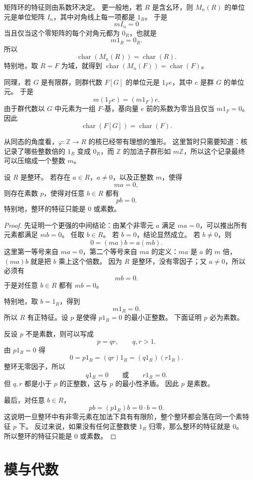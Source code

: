 矩阵环的特征则由系数环决定。
更一般地，若 $R$ 是含幺环，则 $M_n(R)$ 的单位元是单位矩阵 $I_n$，其中对角线上每一项都是 $1_R$。
于是
\[
mI_n=0
\]
当且仅当这个零矩阵的每个对角元都为 $0_R$，也就是
\[
m1_R=0_R.
\]
所以
\[
\operatorname{char}(M_n(R))=\operatorname{char}(R).
\]
特别地，取 $R=F$ 为域，就得到 $\operatorname{char}(M_n(F))=\operatorname{char}(F)$。

同理，若 $G$ 是有限群，则群代数 $F[G]$ 的单位元是 $1_F e$，其中 $e$ 是群 $G$ 的单位元。
于是
\[
m(1_F e)=(m1_F)e.
\]
由于群代数以 $G$ 中元素为一组 $F$-基，基向量 $e$ 前的系数为零当且仅当 $m1_F=0$。
因此
\[
\operatorname{char}(F[G])=\operatorname{char}(F).
\]

从同态的角度看，$\varphi:\mathbb Z\to R$ 的核已经带有理想的雏形。
这里暂时只需要知道：核记录了哪些整数倍的 $1_R$ 变成 $0_R$，而 $\mathbb Z$ 的加法子群形如 $m\mathbb Z$，所以这个记录最终可以压缩成一个整数 $m$。

\begin{theorem}[整环的特征]\label{thm:domain-characteristic}
设 $R$ 是整环。
若存在 $a\in R$，$a\neq0$，以及正整数 $m$，使得
\[
ma=0,
\]
则存在素数 $p$，使得对任意 $b\in R$ 都有
\[
pb=0.
\]
特别地，整环的特征只能是 $0$ 或素数。
\end{theorem}

\begin{proof}
先证明一个更强的中间结论：由某个非零元 $a$ 满足 $ma=0$，可以推出所有元素都满足 $mb=0$。
任取 $b\in R$。
若 $b=0$，结论显然成立。
若 $b\neq0$，则
\[
0=(ma)b=a(mb).
\]
这里第一等号来自 $ma=0$，第二个等号来自 $ma$ 的定义：$ma$ 是 $a$ 的 $m$ 倍，$(ma)b$ 就是把 $b$ 乘上这个倍数。
因为 $R$ 是整环，没有零因子；又 $a\neq0$，所以必须有
\[
mb=0.
\]
于是对任意 $b\in R$ 都有 $mb=0$。

特别地，取 $b=1_R$，得到
\[
m1_R=0.
\]
所以 $R$ 有正特征。设 $p$ 是使得 $p1_R=0$ 的最小正整数。
下面证明 $p$ 必为素数。

反设 $p$ 不是素数，则可以写成
\[
p=qr,\qquad q,r>1.
\]
由 $p1_R=0$ 得
\[
0=p1_R=(qr)1_R=(q1_R)(r1_R).
\]
整环无零因子，所以
\[
q1_R=0\qquad\text{或}\qquad r1_R=0.
\]
但 $q,r$ 都是小于 $p$ 的正整数，这与 $p$ 的最小性矛盾。
因此 $p$ 是素数。

最后，对任意 $b\in R$，
\[
pb=(p1_R)b=0\cdot b=0.
\]
这说明一旦整环中有非零元素在加法下具有有限阶，整个整环都会落在同一个素特征 $p$ 下。
反过来说，如果没有任何正整数使 $1_R$ 归零，那么整环的特征就是 $0$。
所以整环的特征只能是 $0$ 或素数。
\end{proof}

\section{模与代数}\label{sec:modules-and-algebras}

